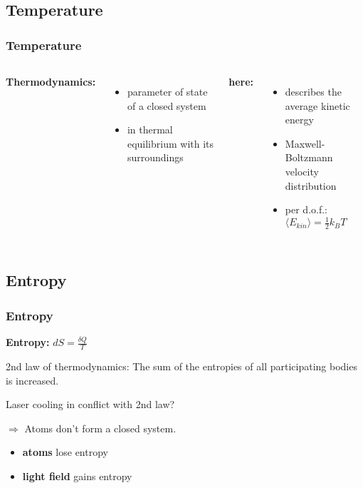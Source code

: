 \documentclass[aspectratio=169]{beamer}
\begin{document}
\subsection{Temperature}

\begin{frame}
  \frametitle{Temperature}
  \begin{columns}
      \textbf{Thermodynamics:}
      \begin{itemize}
        \item parameter of state of a closed system
        \item in thermal equilibrium with its surroundings
      \end{itemize}
      \pause
      \textbf{here:}
      \begin{itemize}
        \item describes the average kinetic energy
        \item Maxwell-Boltzmann velocity distribution
        \item per d.o.f.: $\langle E_{kin} \rangle = \frac{1}{2} k_B T$
        
      \end{itemize}
  \end{columns}
\end{frame}

\subsection{Entropy}

\begin{frame}
  \frametitle{Entropy}
  \begin{center}
    \textbf{Entropy:} $dS = \frac{\delta Q}{T}$ %
  \end{center}
  \begin{block}{2nd law of thermodynamics:}
    The sum of the entropies of all participating bodies is increased.    
  \end{block}
    \pause
    \bigskip
    \alert{Laser cooling in conflict with 2nd law?}
    
    \bigskip
    \pause
    $\Rightarrow$ Atoms don't form a closed system.
    \begin{itemize}
      \item \textbf{atoms} lose entropy
      \item \textbf{light field}  gains entropy
    \end{itemize}
    
    \medskip
      
\end{frame}
\end{document}
